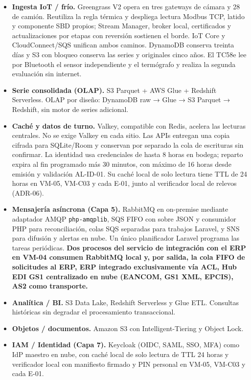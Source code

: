 \begin{itemize}
\item \textbf{Ingesta IoT / frío.} Greengrass V2 opera en tres gateways de cámara y 28 de camión. Reutiliza la regla térmica y despliega lectura Modbus TCP, latido y componente SBD propios; Stream Manager, broker local, certificados y actualizaciones por etapas con reversión sostienen el borde. IoT Core y CloudConnect/SQS unifican ambos caminos. DynamoDB conserva treinta días y S3 con bloqueo conserva las series y originales cinco años. El TC58e lee por Bluetooth el sensor independiente y el termógrafo y realiza la segunda evaluación sin internet.

\item \textbf{Serie consolidada (OLAP).} S3 Parquet + AWS Glue + Redshift Serverless. OLAP por diseño: DynamoDB raw → Glue → S3 Parquet → Redshift, sin motor de series adicional.

\item \textbf{Caché y datos de turno.} Valkey, compatible con Redis, acelera las lecturas centrales. No se exige Valkey en cada sitio. Las APIs entregan una copia cifrada para SQLite/Room y conservan por separado la cola de escrituras sin confirmar. La identidad usa credenciales de hasta 8 horas en bodega; reparto expira al fin programado más 30 minutos, con máximo de 16 horas desde emisión y validación AL-ID-01. Su caché local de solo lectura tiene TTL de 24 horas en VM-05, VM-C03 y cada E-01, junto al verificador local de relevos (ADR-06).

\item \textbf{Mensajería asíncrona (Capa 5).} RabbitMQ en on-premise mediante adaptador AMQP \texttt{php-amqplib}, SQS FIFO con sobre JSON y consumidor PHP para reconciliación, colas SQS separadas para trabajos Laravel, y SNS para difusión y alertas en nube. Un único planificador Laravel programa las tareas periódicas. \textbf{Dos procesos del servicio de integración con el ERP en VM-04 consumen RabbitMQ local y, por salida, la cola FIFO de solicitudes al ERP, ERP integrado exclusivamente vía ACL, Hub EDI GS1 centralizado en nube (EANCOM, GS1 XML, EPCIS), AS2 como transporte.}

\item \textbf{Analítica / BI.} S3 Data Lake, Redshift Serverless y Glue ETL. Consultas históricas sin degradar el procesamiento transaccional.

\item \textbf{Objetos / documentos.} Amazon S3 con Intelligent-Tiering y Object Lock.

\item \textbf{IAM / Identidad (Capa 7).} Keycloak (OIDC, SAML, SSO, MFA) como IdP maestro en nube, con caché local de solo lectura de TTL 24 horas y verificador local con manifiesto firmado y PIN personal en VM-05, VM-C03 y cada E-01.


\end{itemize}
